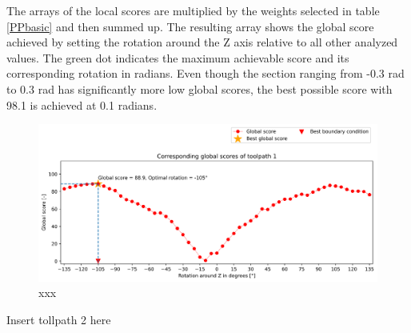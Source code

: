 The arrays of the local scores are multiplied by the weights selected in table \ref{PPbasic} and then summed up. The resulting array shows the global score achieved by setting the rotation around the Z axis relative to all other analyzed values. The green dot indicates the maximum achievable score and its corresponding rotation in radians.
Even though the section ranging from -0.3 rad to 0.3 rad has significantly more low global scores, the best possible score with 98.1 is achieved at 0.1 radians.

\begin{figure}[H]
	\centerline{\includegraphics[width=1\textwidth]{figures/best_c_1.png}}
	\caption{xxx}
	\label{GS1}
\end{figure}


Insert tollpath 2  here

